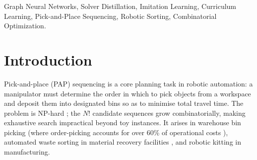 \documentclass[conference]{IEEEtran}
\begin{document}
\begin{abstract}
Integer Linear Programming (ILP) solvers produce provably optimal pick-and-place (PAP) sequences but become intractable beyond ${\sim}30$--$40$ objects, while greedy heuristics scale trivially yet sacrifice 3--5\% in travel cost even when accounting for placement distance, and up to 10--40\% in constrained conveyor settings \cite{han2019pap}. We bridge this gap by \emph{distilling} the decision quality of an ILP solver into a lightweight Graph Neural Network (GNN) policy. The key enabler is a heterogeneous directed graph with typed edges encoding the robot-to-object, object-to-bin, and bin-to-robot cost legs of each pick-and-place cycle, a cycle-aware topology that captures structural information discarded by flat sequence-to-sequence neural combinatorial optimisation (NCO) architectures. Trained via curriculum-based imitation learning on ILP-optimal prefixes with greedy fallback, the policy achieves costs within \mbox{0.03--2.14\%} of ILP on representative 40-object scenes (per-sample evaluation), improves 3.36\% over greedy on average, and wins on 97.6\% of 500 held-out scenarios ($p < 10^{-150}$, paired $t$-test). Crucially, it scales to $N{=}200$ objects where ILP is entirely infeasible, extending near-optimal decision-making beyond the reach of the exact solver itself.
\end{abstract}

\begin{IEEEkeywords}
Graph Neural Networks, Solver Distillation, Imitation Learning, Curriculum Learning, Pick-and-Place Sequencing, Robotic Sorting, Combinatorial Optimization.
\end{IEEEkeywords}

\section{Introduction}

Pick-and-place (PAP) sequencing is a core planning task in robotic automation: a manipulator must determine the order in which to pick objects from a workspace and deposit them into designated bins so as to minimise total travel time. The problem is NP-hard \cite{chalasani1996}; the $N!$ candidate sequences grow combinatorially, making exhaustive search impractical beyond toy instances. It arises in warehouse bin picking (where order-picking accounts for over 60\% of operational costs \cite{cheng2024drl}), automated waste sorting in material recovery facilities \cite{gundupalli2020sequence, kiyokawa2024challenges}, and robotic kitting in manufacturing.
\end{document}

